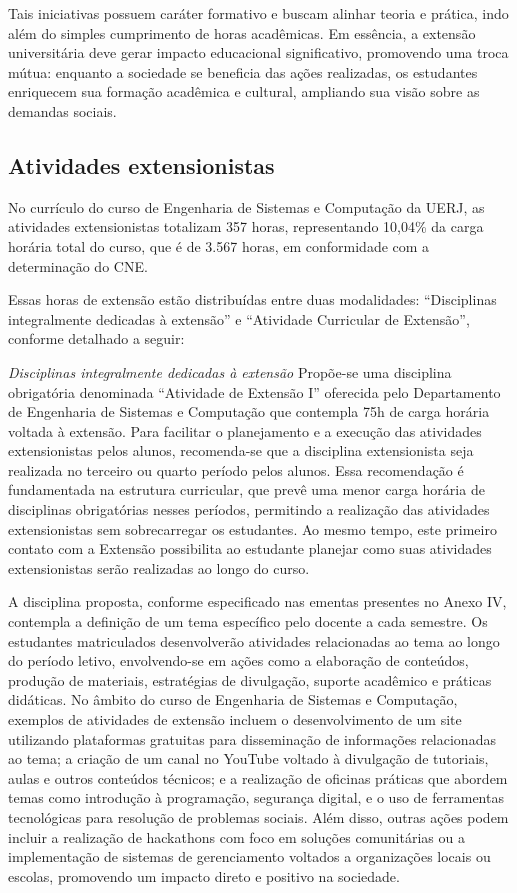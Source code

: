 Tais iniciativas possuem caráter formativo e buscam alinhar teoria e prática, indo além do simples cumprimento de horas acadêmicas. Em essência, a extensão universitária deve gerar impacto educacional significativo, promovendo uma troca mútua: enquanto a sociedade se beneficia das ações realizadas, os estudantes enriquecem sua formação acadêmica e cultural, ampliando sua visão sobre as demandas sociais.

\subsection{Atividades extensionistas}

No currículo do curso de Engenharia de Sistemas e Computação da UERJ, as atividades extensionistas totalizam 357 horas, representando 10,04\% da carga horária total do curso, que é de 3.567 horas, em conformidade com a determinação do CNE.

Essas horas de extensão estão distribuídas entre duas modalidades: “Disciplinas integralmente dedicadas à extensão” e “Atividade Curricular de Extensão”, conforme detalhado a seguir:

\textit{Disciplinas integralmente dedicadas à extensão}
Propõe-se uma disciplina obrigatória denominada “Atividade de Extensão I” oferecida pelo Departamento de Engenharia de Sistemas e Computação que contempla 75h de carga horária voltada à extensão. Para facilitar o planejamento e a execução das atividades extensionistas pelos alunos, recomenda-se que a disciplina  extensionista seja realizada no terceiro ou quarto período pelos alunos. Essa recomendação é fundamentada na estrutura curricular, que prevê uma menor carga horária de disciplinas obrigatórias nesses períodos, permitindo a realização das atividades extensionistas sem sobrecarregar os estudantes. Ao mesmo tempo, este primeiro contato com a Extensão possibilita ao estudante planejar como suas atividades extensionistas serão realizadas ao longo do curso.

A disciplina proposta, conforme especificado nas ementas presentes no Anexo IV, contempla a definição de um tema específico pelo docente a cada semestre. Os estudantes matriculados desenvolverão atividades relacionadas ao tema ao longo do período letivo, envolvendo-se em ações como a elaboração de conteúdos, produção de materiais, estratégias de divulgação, suporte acadêmico e práticas didáticas. No âmbito do curso de Engenharia de Sistemas e Computação, exemplos de atividades de extensão incluem o desenvolvimento de um site utilizando plataformas gratuitas para disseminação de informações relacionadas ao tema; a criação de um canal no YouTube voltado à divulgação de tutoriais, aulas e outros conteúdos técnicos; e a realização de oficinas práticas que abordem temas como introdução à programação, segurança digital, e o uso de ferramentas tecnológicas para resolução de problemas sociais. Além disso, outras ações podem incluir a realização de hackathons com foco em soluções comunitárias ou a implementação de sistemas de gerenciamento voltados a organizações locais ou escolas, promovendo um impacto direto e positivo na sociedade.


